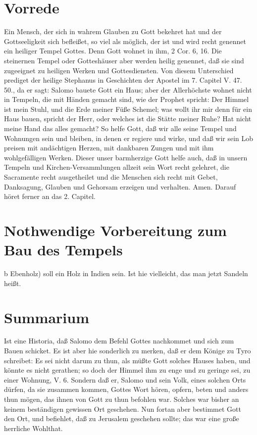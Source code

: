 \section{Vorrede}

Ein Mensch, der sich in wahrem Glauben zu Gott bekehret hat und der Gottseeligkeit sich befleißet, so viel als möglich, der ist und wird recht genennet ein heiliger Tempel Gottes. Denn Gott wohnet in ihm, 2 Cor. 6, 16. Die steinernen Tempel oder Gotteshäuser aber werden heilig genennet, daß sie sind zugeeignet zu heiligen Werken und Gottesdiensten. Von diesem Unterschied prediget der heilige Stephanus in Geschichten der Apostel im 7. Capitel V. 47. 50., da er sagt: Salomo bauete Gott ein Haus; aber der Allerhöchste wohnet nicht in Tempeln, die mit Händen gemacht sind, wie der Prophet spricht: Der Himmel ist mein Stuhl, und die Erde meiner Füße Schemel; was wollt ihr mir denn für ein Haus bauen, spricht der Herr, oder welches ist die Stätte meiner Ruhe? Hat nicht meine Hand das alles gemacht? So helfe Gott, daß wir alle seine Tempel und Wohnungen sein und bleiben, in denen er regiere und wirke, und daß wir sein Lob preisen mit andächtigen Herzen, mit dankbaren Zungen und mit ihm wohlgefälligen Werken. Dieser unser barmherzige Gott helfe auch, daß in unsern Tempeln und Kirchen-Versammlungen allzeit sein Wort recht gelehret, die Sacramente recht ausgetheilet und die Menschen sich recht mit Gebet, Danksagung, Glauben und Gehorsam erzeigen und verhalten. Amen. Darauf höret ferner an das 2. Capitel.

\section[Nothwendige Vorbereitung zum Bau des Tempels]{Nothwendige Vorbereitung zum Bau des Tempels}

b Ebenholz) soll ein Holz in Indien sein. Ist hie vielleicht, das man jetzt Sandeln heißt.

\section{Summarium}

Ist eine Historia, daß Salomo dem Befehl Gottes nachkommet und sich zum Bauen schicket. Es ist aber hie sonderlich zu merken, daß er dem Könige zu Tyro schreibet: Es sei nicht darum zu thun, als müßte Gott solches Hauses haben, und könnte es nicht gerathen; so doch der Himmel ihm zu enge und zu geringe sei, zu einer Wohnung, V. 6. Sondern daß er, Salomo und sein Volk, eines solchen Orts dürfen, da sie zusammen kommen, Gottes Wort hören, opfern, beten und anders thun mögen, das ihnen von Gott zu thun befohlen war. Solches war bisher an keinem beständigen gewissen Ort geschehen. Nun fortan aber bestimmet Gott den Ort, und befiehlet, daß zu Jerusalem geschehen sollte; das war eine große herrliche Wohlthat.

